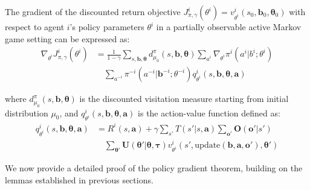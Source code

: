 \begin{theorem}
    The gradient of the discounted return objective $J^{i}_{\pi, \gamma}(\theta^{i}) = v
            ^{i}_{\theta^i}(s_{0}, \boldsymbol{b}_{0}, \boldsymbol{\theta}_{0})$ with respect
    to agent $i$'s policy parameters $\theta^{i}$ in a partially observable active
    Markov game setting can be expressed as:
    \begin{align}
        \nabla_{\theta^i}J^{i}_{\pi, \gamma}(\theta^{i}) & = \frac{1}{1-\gamma}\sum_{s, \boldsymbol{b}, \boldsymbol{\theta}}d^{\pi}_{\mu_0}(s, \boldsymbol{b}, \boldsymbol{\theta}) \sum_{a^i}\nabla_{\theta^i}\pi^{i}(a^{i}|b^{i}; \theta^{i}) \nonumber \\
                                                         & \quad \sum_{a^{-i}}\pi^{-i}(a^{-i}|\boldsymbol{b}^{-i}; \theta^{-i}) q^{i}_{\theta^i}(s, \boldsymbol{b}, \boldsymbol{\theta}, \boldsymbol{a})
    \end{align}

    where $d^{\pi}_{\mu_0}(s, \boldsymbol{b}, \boldsymbol{\theta})$ is the discounted
    visitation measure starting from initial distribution $\mu_{0}$, and
    $q^{i}_{\theta^i}(s, \boldsymbol{b}, \boldsymbol{\theta}, \boldsymbol{a})$ is
    the action-value function defined as:
    \begin{align}
        q^{i}_{\theta^i}(s, \boldsymbol{b}, \boldsymbol{\theta}, \boldsymbol{a}) & = R^{i}(s, \boldsymbol{a}) + \gamma \sum_{s'}T(s'|s, \boldsymbol{a}) \sum_{\boldsymbol{o}'}\boldsymbol{O}(\boldsymbol{o}'|s') \nonumber                                                                                 \\
                                                                                 & \quad \sum_{\boldsymbol{\theta}'}\boldsymbol{U}(\boldsymbol{\theta}'|\boldsymbol{\theta}, \boldsymbol{\tau}) v^{i}_{\theta^i}(s', \text{update}(\boldsymbol{b}, \boldsymbol{a}, \boldsymbol{o}'), \boldsymbol{\theta}')
    \end{align}
\end{theorem}We now provide a detailed proof of the policy gradient theorem, building
on the lemmas established in previous sections.
